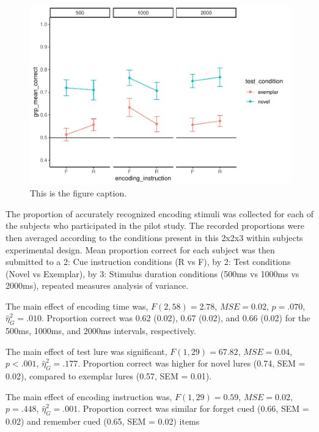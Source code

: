 \documentclass[
  english,
  man,floatsintext]{apa6}
\begin{document}
\begin{figure}
\centering
\includegraphics{honorsThesis_files/figure-latex/e1fig-1.pdf}
\caption{\label{fig:e1fig}This is the figure caption.}
\end{figure}

The proportion of accurately recognized encoding stimuli was collected for each of the subjects who participated in the pilot study. The recorded proportions were then averaged according to the conditions present in this 2x2x3 within subjects experimental design. Mean proportion correct for each subject was then submitted to a 2: Cue instruction conditions (R vs F), by 2: Test conditions (Novel vs Exemplar), by 3: Stimulus duration conditions (500ms vs 1000ms vs 2000ms), repeated measures analysis of variance.

The main effect of encoding time was, \(F(2, 58) = 2.78\), \(\mathit{MSE} = 0.02\), \(p = .070\), \(\hat{\eta}^2_G = .010\). Proportion correct was 0.62 (0.02), 0.67 (0.02), and 0.66 (0.02) for the 500ms, 1000ms, and 2000ms intervals, respectively.

The main effect of test lure was significant, \(F(1, 29) = 67.82\), \(\mathit{MSE} = 0.04\), \(p < .001\), \(\hat{\eta}^2_G = .177\). Proportion correct was higher for novel lures (0.74, SEM = 0.02), compared to exemplar lures (0.57, SEM = 0.01).

The main effect of encoding instruction was, \(F(1, 29) = 0.59\), \(\mathit{MSE} = 0.02\), \(p = .448\), \(\hat{\eta}^2_G = .001\). Proportion correct was similar for forget cued (0.66, SEM = 0.02) and remember cued (0.65, SEM = 0.02) items
\end{document}
